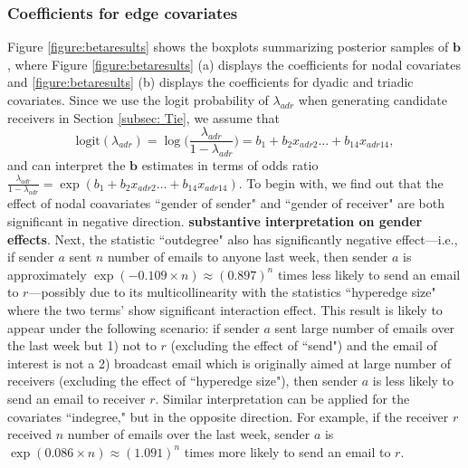 \documentclass[ba]{imsart}
\numberwithin{equation}{section}
\theoremstyle{plain}
\begin{document}
	\subsubsection{Coefficients for edge covariates}
	Figure \ref{figure:betaresults} shows the boxplots summarizing posterior samples of $\boldsymbol{b}$, where Figure \ref{figure:betaresults} (a) displays the coefficients for nodal covariates and \ref{figure:betaresults} (b) displays the coefficients for dyadic and triadic covariates. Since we use the logit probability of $\lambda_{adr}$ when generating candidate receivers in Section \ref{subsec: Tie}, we assume that 
	\begin{equation*}
	\mbox{logit}(\lambda_{adr})=\log\Big(\frac{\lambda_{adr}}{1-\lambda_{adr}}\Big) =b_{1}+b_{2} x_{adr2}\ldots+b_{14}x_{adr14},
	\end{equation*}
	and can interpret the $\boldsymbol{b}$ estimates in terms of odds ratio $\frac{\lambda_{adr}}{1-\lambda_{adr}}=\exp(b_{1}+b_{2} x_{adr2}\ldots+b_{14}x_{adr14})$.
	To begin with, we find out that the effect of nodal coavariates ``gender of sender" and ``gender of receiver" are both significant in negative direction. \textbf{substantive interpretation on gender effects}. Next, the statistic ``outdegree" also has significantly negative effect---i.e., if sender $a$ sent $n$ number of emails to anyone last week, then sender $a$ is approximately $\exp(-0.109\times n)\approx(0.897)^n$ times less likely to send an email to $r$---possibly due to its multicollinearity with the statistics ``hyperedge size" where the two terms' show significant interaction effect. This result is likely to appear under the following scenario: if sender $a$ sent large number of emails over the last week but 1) not to $r$ (excluding the effect of ``send") and the email of interest is not a  2) broadcast email which is originally aimed at large number of receivers (excluding the effect of ``hyperedge size"), then sender $a$ is less likely to send an email to receiver $r$. Similar interpretation can be applied for the covariates ``indegree," but in the opposite direction. For example, if the receiver $r$ received $n$ number of emails over the last week, sender $a$ is $\exp(0.086\times n)\approx(1.091)^n $ times more likely to send an email to $r$. 
\end{document}
